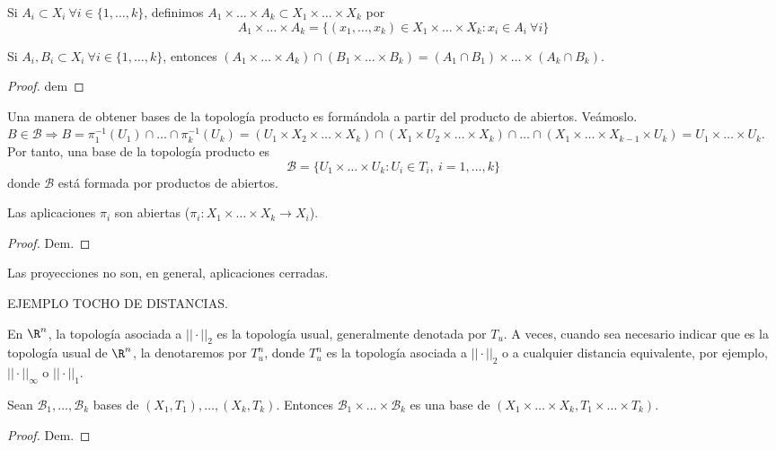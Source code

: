\begin{ndef}
  Si $A_i \subset X_i \ \forall i \in \{1, \dots, k\}$, definimos $A_1 \times \dots \times A_k \subset X_1 \times \dots \times X_k$ por
  \[A_1 \times \dots \times A_k = \{(x_1,\dots,x_k) \in X_1 \times \dots \times X_k : x_i \in A_i \ \forall i\}\]
\end{ndef}
\begin{properties}
    Si $A_i,B_i \subset X_i \ \forall i \in \{1,\dots,k\}$, entonces $(A_1 \times \dots \times A_k) \cap (B_1 \times \dots \times B_k) = (A_1 \cap B_1) \times \dots \times (A_k \cap B_k)$.
\end{properties}
\begin{proof}
    dem
\end{proof}
Una manera de obtener bases de la topología producto es formándola a partir del producto de abiertos. Veámoslo. 
$B \in \mathcal{B} \Rightarrow B = \pi^{-1}_1(U_1) \cap \dots\cap \pi^{-1}_k(U_k) = (U_1 \times X_2 \times \dots \times X_k) \cap (X_1 \times U_2 \times \dots \times X_k) \cap \dots \cap (X_1 \times \dots \times X_{k-1} \times U_k) = U_1 \times \dots \times U_k$. Por tanto, una base de la topología producto es
\[\mathcal{B} = \{U_1 \times \dots \times U_k : U_i \in T_i,\ i = 1,\dots,k\}\]
donde $\mathcal{B}$ está formada por productos de abiertos.
\begin{properties}
    Las aplicaciones $\pi_i$ son abiertas ($\pi_i: X_1 \times \dots \times X_k \to X_i$).
\end{properties}
\begin{proof}
    Dem.
\end{proof}
\begin{exmp}
    Las proyecciones no son, en general, aplicaciones cerradas.
\end{exmp}
EJEMPLO TOCHO DE DISTANCIAS.
\begin{exmp}
    En $\R^n$, la topología asociada a $||\cdot||_2$ es la topología usual, generalmente denotada por $T_u$. A veces, cuando sea necesario indicar que es la topología usual de $\R^n$, la denotaremos por $T^n_u$, donde $T^n_u$ es la topología asociada a $||\cdot||_2$ o a cualquier distancia equivalente, por ejemplo, $||\cdot||_{\infty}$ o $||\cdot||_1$.
\end{exmp}

\begin{properties}
    Sean $\mathcal{B}_1, \dots, \mathcal{B}_k$ bases de $(X_1,T_1), \dots, (X_k, T_k)$. Entonces $\mathcal{B}_1 \times \dots \times \mathcal{B}_k$ es una base de $(X_1 \times \dots \times X_k, T_1 \times \dots \times T_k)$.
\end{properties}
\begin{proof}
    Dem.
\end{proof}

